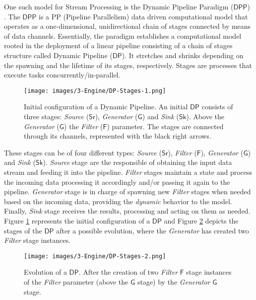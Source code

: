 One such model for Stream Processing is the Dynamic Pipeline Paradigm ($\mathsf{DPP}$) \cite{DP-pasarella2024computational}. The $\mathsf{DPP}$ is a PP (Pipeline Parallelism) data driven computational model that operates as a one-dimensional, unidirectional chain of stages connected by means of data channels. Essentially, the paradigm establishes a computational model rooted in the deployment of a linear pipeline consisting of a chain of stages structure called Dynamic Pipeline ($\mathsf{DP}$). It stretches and
shrinks depending on the spawning and the lifetime of its stages, respectively. Stages are processes that execute tasks concurrently/in-parallel.\\

\begin{figure}[H]
  \centering
  \texttt{[image: images/3-Engine/DP-Stages-1.png]}
  \caption{Initial configuration of a Dynamic Pipeline. An initial $\mathsf{DP}$ consists of three stages: \emph{Source} ($\mathsf{Sr}$), \emph{Generator} ($\mathsf{G}$) and \emph{Sink} ($\mathsf{Sk}$). Above the  \emph{Generator} ($\mathsf{G}$) the \emph{Filter} ($\mathsf{F}$) parameter. The stages are connected through its channels, represented with the black right arrows.}
  \label{img:DP-Stages-1}
\end{figure}

These stages can be of four different types: \emph{Source} ($\mathsf{Sr}$), \emph{Filter} ($\mathsf{F}$), \emph{Generator} ($\mathsf{G}$) and \emph{Sink} ($\mathsf{Sk}$). \emph{Source} stage are the responsible of obtaining the input data stream and feeding it into the pipeline. \emph{Filter} stages maintain a state and process the incoming data processing it accordingly and/or passing it again to the pipeline. \emph{Generator} stage is in charge of spawning new \emph{Filter} stages when needed based on the incoming data, providing the \textit{dynamic} behavior to the model. Finally, \emph{Sink} stage receives the results, processing and acting on them as needed.
Figure \ref{img:DP-Stages-1} represents the initial configuration of a $\mathsf{DP}$ and Figure \ref{img:DP-Stages-2} depicts the stages of the $\mathsf{DP}$ after a possible evolution, where the \emph{Generator} has created two \emph{Filter} stage instances.\\

\begin{figure}[H]
  \centering
  \texttt{[image: images/3-Engine/DP-Stages-2.png]}
  \caption{Evolution of a $\mathsf{DP}$. After the creation of two \emph{Filter} $\mathsf{F}$ stage instances of the \emph{Filter} parameter (above the $\mathsf{G}$ stage) by the \emph{Generator} $\mathsf{G}$ stage.}
  \label{img:DP-Stages-2}
\end{figure}

